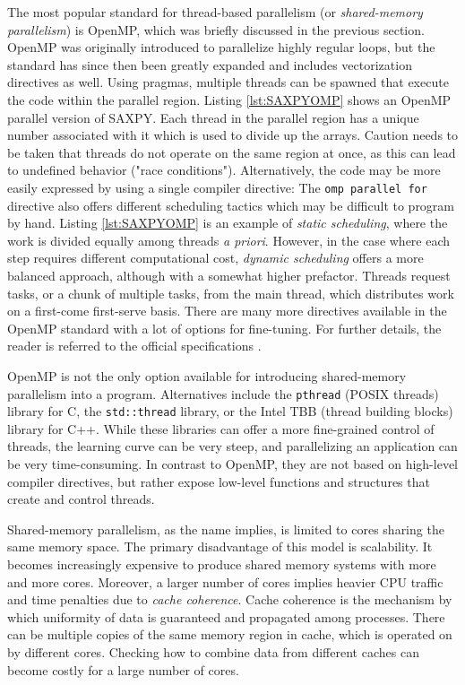 The most popular standard for thread-based parallelism (or \emph{shared-memory parallelism}) is OpenMP, which was briefly discussed in the previous section. OpenMP was originally introduced to parallelize highly regular loops, but the standard has since then been greatly expanded and includes vectorization directives as well. Using pragmas, multiple threads can be spawned that execute the code within the parallel region. Listing \ref{lst:SAXPYOMP} shows an OpenMP parallel version of SAXPY. Each thread in the parallel region has a unique number associated with it which is used to divide up the arrays. Caution needs to be taken that threads do not operate on the same region at once, as this can lead to undefined behavior ("race conditions").  
\noindent Alternatively, the code may be more easily expressed by using a single compiler directive:
\noindent The \texttt{omp parallel for} directive also offers different scheduling tactics which may be difficult to program by hand. Listing \ref{lst:SAXPYOMP} is an example of \emph{static scheduling}, where the work is divided equally among threads \emph{a priori}. However, in the case where each step requires different computational cost, \emph{dynamic scheduling} offers a more balanced approach, although with a somewhat higher prefactor. Threads request tasks, or a chunk of multiple tasks, from the main thread, which distributes work on a first-come first-serve basis. There are many more directives available in the OpenMP standard with a lot of options for fine-tuning. For further details, the reader is referred to the official specifications \cite{OMP2021}.

OpenMP is not the only option available for introducing shared-memory parallelism into a program. Alternatives include the \texttt{pthread} (POSIX threads) library for C, the \texttt{std::thread} library, or the Intel TBB (thread building blocks) library for C++. While these libraries can offer a more fine-grained control of threads, the learning curve can be very steep, and parallelizing an application can be very time-consuming. In contrast to OpenMP, they are not based on high-level compiler directives, but rather expose low-level functions and structures that create and control threads. 

Shared-memory parallelism, as the name implies, is limited to cores sharing the same memory space. The primary disadvantage of this model is scalability. It becomes increasingly expensive to produce shared memory systems with more and more cores. Moreover, a larger number of cores implies heavier CPU traffic and time penalties due to \emph{cache coherence}. Cache coherence is the mechanism by which uniformity of data is guaranteed and propagated among processes. There can be multiple copies of the same memory region in cache, which is operated on by different cores. Checking how to combine data from different caches can become costly for a large number of cores.

